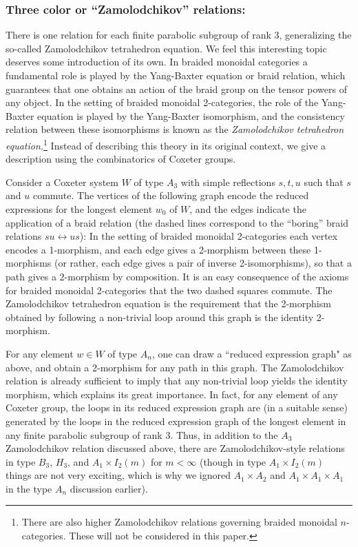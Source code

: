 \subsubsection{Three color or ``Zamolodchikov'' relations:} \label{threecolorintro} There is one relation for each finite parabolic subgroup of rank 3, generalizing the so-called
Zamolodchikov tetrahedron equation. We feel this interesting topic deserves some introduction of its own. In braided monoidal categories a
fundamental role is played by the Yang-Baxter equation or braid relation, which guarantees that one obtains an action of the braid group on the tensor powers of any object. In the setting
of braided monoidal 2-categories, the role of the Yang-Baxter equation is played by the Yang-Baxter isomorphism, and the consistency relation between these isomorphisms is known as the
\emph{Zamolodchikov tetrahedron equation.}\footnote{There are also higher Zamolodchikov relations governing braided monoidal $n$-categories. These will not be considered in this paper.} Instead of describing this theory in its original context, we give a description using the combinatorics of Coxeter groups.

Consider a Coxeter system $W$ of type $A_3$ with simple reflections $s,t,u$ such that $s$ and $u$ commute. The vertices of the following graph encode the reduced expressions for the
longest element $w_0$ of $W$, and the edges indicate the application of a braid relation (the dashed lines correspond to the ``boring'' braid relations $su \leftrightarrow us$):
 In the setting of braided monoidal 2-categories each vertex encodes a 1-morphism, and each edge gives a 2-morphism between these 1-morphisms (or rather, each edge
gives a pair of inverse 2-isomorphisms), so that a path gives a 2-morphism by composition. It is an easy consequence of the axioms for braided monoidal
2-categories that the two dashed squares commute. The Zamolodchikov tetrahedron equation is the requirement that the 2-morphism obtained by following a non-trivial loop around this graph
is the identity 2-morphism.

For any element $w \in W$ of type $A_n$, one can draw a ``reduced expression graph" as above, and obtain a 2-morphism for any path in this graph. The Zamolodchikov relation is already
sufficient to imply that any non-trivial loop yields the identity morphism, which explains its great importance. In fact, for any element of any Coxeter group, the loops in its reduced
expression graph are (in a suitable sense) generated by the loops in the reduced expression graph of the longest element in any finite parabolic subgroup of rank 3. Thus, in addition to the $A_3$ Zamolodchikov relation discussed above, there are Zamolodchikov-style relations in type $B_3$, $H_3$, and $A_1 \times I_2(m)$ for $m < \infty$ (though in type $A_1 \times I_2(m)$ things are not very exciting, which is why we ignored $A_1 \times A_2$ and $A_1 \times A_1 \times A_1$ in the type $A_n$ discussion earlier).

